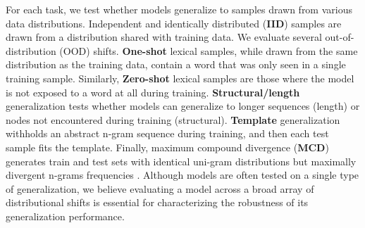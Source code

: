 For each task, we test whether models generalize to samples drawn from various data distributions. Independent and identically distributed (\textbf{IID}) samples are drawn from a distribution shared with training data. We evaluate several out-of-distribution (OOD) shifts. \textbf{One-shot} lexical samples, while drawn from the same distribution as the training data, contain a word that was only seen in a single training sample. Similarly, \textbf{Zero-shot} lexical samples are those where the model is not exposed to a word at all during training. \textbf{Structural/length} generalization tests whether models can generalize to longer sequences (length) or nodes not encountered during training (structural). \textbf{Template} generalization withholds an abstract n-gram sequence during training, and then each test sample fits the template. Finally, maximum compound divergence (\textbf{MCD}) generates train and test sets with identical uni-gram distributions but maximally divergent n-grams frequencies \citep{keysers2020measuring}. Although models are often tested on a single type of generalization, we believe evaluating a model across a broad array of distributional shifts is essential for characterizing the robustness of its generalization performance.

